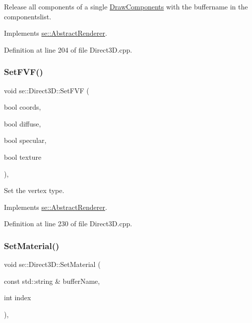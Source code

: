 Release all components of a single \mbox{\hyperlink{structse_1_1_draw_components}{Draw\+Components}} with the buffername in the componentslist. 

Implements \mbox{\hyperlink{classse_1_1_abstract_renderer_af6d6d012f070f95d4c49713002872fcc}{se\+::\+Abstract\+Renderer}}.



Definition at line 204 of file Direct3\+D.\+cpp.

\mbox{\label{classse_1_1_direct3_d_a1bf0217e47f4fb360f427517f86c75cd}} 
\subsubsection{\texorpdfstring{Set\+F\+V\+F()}{SetFVF()}}
{\footnotesize\ttfamily void se\+::\+Direct3\+D\+::\+Set\+F\+VF (\begin{DoxyParamCaption}\item[{bool}]{coords,  }\item[{bool}]{diffuse,  }\item[{bool}]{specular,  }\item[{bool}]{texture }\end{DoxyParamCaption})\hspace{0.3cm}{\ttfamily [override]}, {\ttfamily [virtual]}}

Set the vertex type. 

Implements \mbox{\hyperlink{classse_1_1_abstract_renderer_ad1f734c1726062752a3d43b5eaf77c04}{se\+::\+Abstract\+Renderer}}.



Definition at line 230 of file Direct3\+D.\+cpp.

\mbox{\label{classse_1_1_direct3_d_acfaad7a7cfbace7d34eb7dae9e9bf9d2}} 
\subsubsection{\texorpdfstring{Set\+Material()}{SetMaterial()}}
{\footnotesize\ttfamily void se\+::\+Direct3\+D\+::\+Set\+Material (\begin{DoxyParamCaption}\item[{const std\+::string \&}]{buffer\+Name,  }\item[{int}]{index }\end{DoxyParamCaption})\hspace{0.3cm}{\ttfamily [override]}, {\ttfamily [virtual]}}


